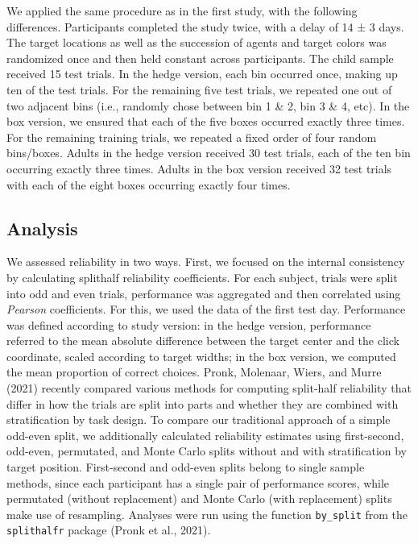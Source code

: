 \documentclass[
  man,floatsintext]{apa6}
\begin{document}
We applied the same procedure as in the first study, with the following differences. Participants completed the study twice, with a delay of 14 ± 3 days. The target locations as well as the succession of agents and target colors was randomized once and then held constant across participants.
The child sample received 15 test trials. In the hedge version, each bin occurred once, making up ten of the test trials. For the remaining five test trials, we repeated one out of two adjacent bins (i.e., randomly chose between bin 1 \& 2, bin 3 \& 4, etc). In the box version, we ensured that each of the five boxes occurred exactly three times. For the remaining training trials, we repeated a fixed order of four random bins/boxes.
Adults in the hedge version received 30 test trials, each of the ten bin occurring exactly three times. Adults in the box version received 32 test trials with each of the eight boxes occurring exactly four times.

\hypertarget{analysis-1}{%
\subsection{Analysis}\label{analysis-1}}

We assessed reliability in two ways. First, we focused on the internal consistency by calculating splithalf reliability coefficients. For each subject, trials were split into odd and even trials, performance was aggregated and then correlated using \emph{Pearson} coefficients. For this, we used the data of the first test day. Performance was defined according to study version: in the hedge version, performance referred to the mean absolute difference between the target center and the click coordinate, scaled according to target widths; in the box version, we computed the mean proportion of correct choices.
Pronk, Molenaar, Wiers, and Murre (2021) recently compared various methods for computing split-half reliability that differ in how the trials are split into parts and whether they are combined with stratification by task design. To compare our traditional approach of a simple odd-even split, we additionally calculated reliability estimates using first-second, odd-even, permutated, and Monte Carlo splits without and with stratification by target position. First-second and odd-even splits belong to single sample methods, since each participant has a single pair of performance scores, while permutated (without replacement) and Monte Carlo (with replacement) splits make use of resampling. Analyses were run using the function \texttt{by\_split} from the \texttt{splithalfr} package (Pronk et al., 2021).
\end{document}
